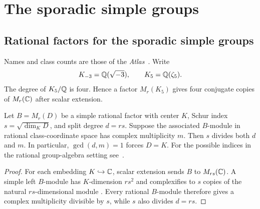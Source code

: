 \section{The sporadic simple groups}
\label{sec:sporadic}

\subsection{Rational factors for the sporadic simple groups}

Names and class counts are those of the \emph{Atlas}~\cite{Atlas}.
Write
\[
 K_{-3}=\mathbb Q(\sqrt{-3}),\qquad K_5=\mathbb Q(\zeta_5).
\]
The degree of $K_5/\mathbb Q$ is four.  Hence a factor $M_r(K_5)$ gives four
conjugate copies of $M_r(\mathbb C)$ after scalar extension.

\begin{lemma}
\label{lem:schur-index}
Let $B=M_r(D)$ be a simple rational factor with center $K$, Schur index
$s=\sqrt{\dim_KD}$, and split degree $d=rs$.  Suppose the associated
$B$-module in rational class-coordinate space has complex multiplicity $m$.
Then $s$ divides both $d$ and $m$.  In particular, $\gcd(d,m)=1$ forces
$D=K$.  For the possible indices in the rational group-algebra setting
see~\cite{Yamada}.
\end{lemma}

\begin{proof}
For each embedding $K\hookrightarrow\mathbb C$, scalar extension sends $B$ to
$M_{rs}(\mathbb C)$.  A simple left $B$-module has $K$-dimension $rs^2$ and
complexifies to $s$ copies of the natural $rs$-dimensional module
\cite[\S{}29]{Reiner}.  Every
rational $B$-module therefore gives a complex multiplicity divisible by
$s$, while $s$ also divides $d=rs$.
\end{proof}

